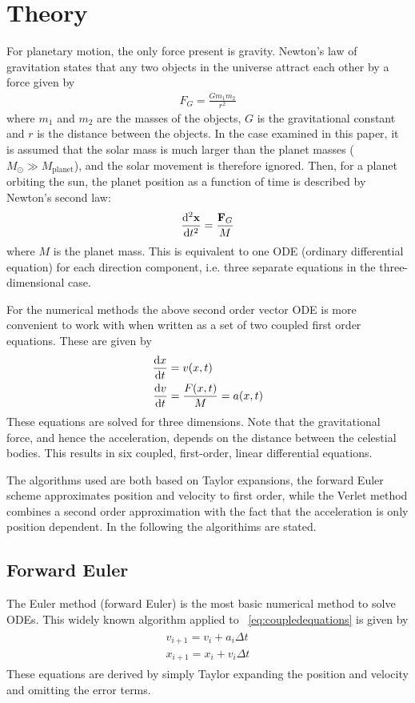 \documentclass[aps,reprint]{revtex4-1}
\begin{document}
\section{Theory}
\label{sec:theory}
For planetary motion, the only force present is gravity. Newton's law of gravitation
states that any two objects in the universe attract each other by a force given
by
\begin{align}
  F_G = \frac{G m_1 m_2}{r^2}
\end{align}
where $m_1$ and $m_2$ are the masses of the objects, $G$ is the
gravitational constant and $r$ is the distance between the objects. In the
case examined in this paper, it is assumed that the solar mass is much larger
than the planet masses ($M_\odot \gg M_\text{planet}$), and the solar
movement is therefore ignored. Then, for a planet orbiting the sun, the
planet position as a function of time is described by Newton's second law:
\begin{align*}
  \dv[2]{\mathbf{x}}{t} = \frac{\mathbf{F}_G}{M}
\end{align*}
where $M$ is the planet mass. This is equivalent to one ODE (ordinary differential
equation) for each direction component, i.e. three separate equations in the
three-dimensional case.

For the numerical methods the above second order vector ODE is more convenient to
work with when written as a set of two coupled first order equations. These
are given by
\begin{align}
  \begin{split}
  \label{eq:coupledequations}
  \dv{x}{t} &= v(x,t) \\
  \dv{v}{t} &= \frac{F(x,t)}{M} = a(x,t)
  \end{split}
\end{align}
These equations are solved for three dimensions. Note that the gravitational force,
and hence the acceleration, depends on the distance between the celestial bodies.
This results in six coupled, first-order, linear differential equations.

The algorithms used are both based on Taylor expansions, the forward Euler
scheme approximates position and velocity to first order, while the Verlet
method combines a second order approximation with the fact that the acceleration
is only position dependent. In the following the algorithims are stated.

\subsection{Forward Euler}
The Euler method (forward Euler) is the most basic numerical method to solve
ODEs. This widely known algorithm applied to ~\ref{eq:coupledequations} is given by
\begin{align*}
  \begin{split}
  v_{i+1} = v_{i} + a_{i}\Delta{t} \\
  x_{i+1} = x_{i} + v_{i}\Delta{t}
\end{split}
\end{align*}
These equations are derived by simply Taylor expanding the position and velocity
and omitting the error terms.
\end{document}
